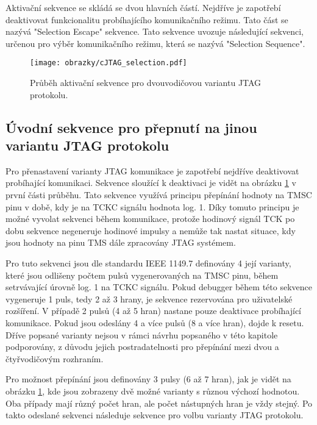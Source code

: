 Aktivační sekvence se skládá se dvou hlavních částí. Nejdříve je zapotřebí deaktivovat funkcionalitu probíhajícího komunikačního režimu. Tato část se nazývá "Selection Escape" sekvence. Tato sekvence uvozuje následující sekvenci, určenou pro výběr komunikačního režimu, která se nazývá "Selection Sequence". \cite{IEEE_1149-7}

\begin{figure}[!h]
  \begin{center}
    \texttt{[image: obrazky/cJTAG\_selection.pdf]}
  \end{center}
  \caption{Průběh aktivační sekvence pro dvouvodičovou variantu \acs{JTAG} protokolu.}
	\label{fig:cJTAG_sel}
\end{figure}

\subsection{Úvodní sekvence pro přepnutí na jinou variantu JTAG protokolu}	\label{subsec:sel_escape}
Pro přenastavení varianty \acs{JTAG} komunikace je zapotřebí nejdříve deaktivovat probíhající komunikaci. Sekvence sloužící k deaktivaci je vidět na obrázku \ref{fig:cJTAG_sel} v první části průběhu. Tato sekvence využívá principu přepínání hodnoty na TMSC pinu v době, kdy je na TCKC signálu hodnota log. 1. Díky tomuto principu je možné vyvolat sekvenci během komunikace, protože hodinový signál \acs{TCK} po dobu sekvence negeneruje hodinové impulsy a nemůže tak nastat situace, kdy jsou hodnoty na pinu \acs{TMS} dále zpracovány \acs{JTAG} systémem. \cite{IEEE_1149-7}

Pro tuto sekvenci jsou dle standardu IEEE 1149.7 definovány 4 její varianty, které jsou odlišeny počtem pulsů vygenerovaných na TMSC pinu, během setrvávající úrovně log. 1 na TCKC signálu. Pokud debugger během této sekvence vygeneruje 1 puls, tedy 2 až 3 hrany, je sekvence rezervována pro uživatelské rozšíření. V případě 2 pulsů (4 až 5 hran) nastane pouze deaktivace probíhající komunikace. Pokud jsou odeslány 4 a více pulsů (8 a více hran), dojde k resetu. Dříve popsané varianty nejsou v rámci návrhu popsaného v této kapitole podporovány, z důvodu jejich postradatelnosti pro přepínání mezi dvou a čtyřvodičovým rozhraním. \cite{IEEE_1149-7}

Pro možnost přepínání jsou definovány 3 pulsy (6 až 7 hran), jak je vidět na obrázku \ref{fig:cJTAG_sel}, kde jsou zobrazeny dvě možné varianty s různou výchozí hodnotou. Oba případy mají různý počet hran, ale počet nástupných hran je vždy stejný. Po takto odeslané sekvenci následuje sekvence pro volbu varianty JTAG protokolu.

